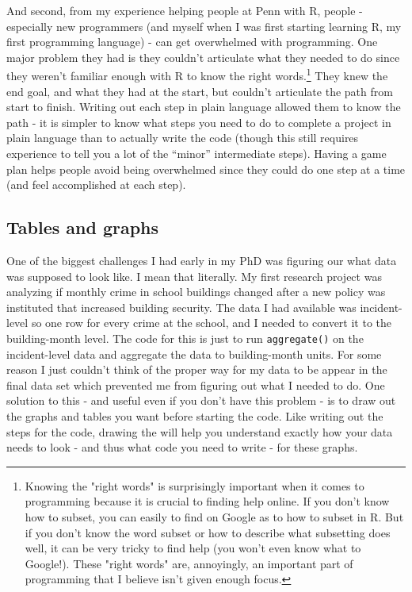 \documentclass[
  12pt,
]{book}
\begin{document}
And second, from my experience helping people at Penn with R, people - especially new programmers (and myself when I was first starting learning R, my first programming language) - can get overwhelmed with programming. One major problem they had is they couldn't articulate what they needed to do since they weren't familiar enough with R to know the right words.\footnote{Knowing the "right words" is surprisingly important when it comes to programming because it is crucial to finding help online. If you don't know how to subset, you can easily to find on Google as to how to subset in R. But if you don't know the word subset or how to describe what subsetting does well, it can be very tricky to find help (you won't even know what to Google!). These "right words" are, annoyingly, an important part of programming that I believe isn't given enough focus.} They knew the end goal, and what they had at the start, but couldn't articulate the path from start to finish. Writing out each step in plain language allowed them to know the path - it is simpler to know what steps you need to do to complete a project in plain language than to actually write the code (though this still requires experience to tell you a lot of the ``minor'' intermediate steps). Having a game plan helps people avoid being overwhelmed since they could do one step at a time (and feel accomplished at each step).

\hypertarget{tables-and-graphs}{%
\subsection{Tables and graphs}\label{tables-and-graphs}}

One of the biggest challenges I had early in my PhD was figuring our what data was supposed to look like. I mean that literally. My first research project was analyzing if monthly crime in school buildings changed after a new policy was instituted that increased building security. The data I had available was incident-level so one row for every crime at the school, and I needed to convert it to the building-month level. The code for this is just to run \texttt{aggregate()} on the incident-level data and aggregate the data to building-month units. For some reason I just couldn't think of the proper way for my data to be appear in the final data set which prevented me from figuring out what I needed to do. One solution to this - and useful even if you don't have this problem - is to draw out the graphs and tables you want before starting the code. Like writing out the steps for the code, drawing the will help you understand exactly how your data needs to look - and thus what code you need to write - for these graphs.
\end{document}
